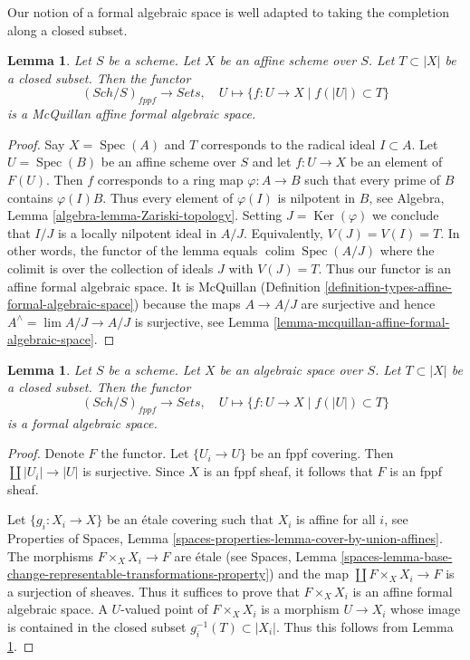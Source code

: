 \documentclass{stacks-project}
\theoremstyle{plain}
\newtheorem{lemma}[subsection]{Lemma}
\theoremstyle{definition}
\theoremstyle{remark}
\numberwithin{equation}{subsection}
\def\lim{\mathop{\mathrm{lim}}\nolimits}
\def\colim{\mathop{\mathrm{colim}}\nolimits}
\def\Spec{\mathop{\mathrm{Spec}}}
\def\Sch{\mathit{Sch}}
\def\Ker{\mathop{\mathrm{Ker}}}
\begin{document}
\noindent
Our notion of a formal algebraic space is well adapted to taking the
completion along a closed subset.

\begin{lemma}
\label{lemma-completion-affine-is-affine-formal-algebraic-space}
Let $S$ be a scheme. Let $X$ be an affine scheme over $S$.
Let $T \subset |X|$ be a closed subset. Then the functor
$$
(\Sch/S)_{fppf} \longrightarrow \textit{Sets},\quad
U \longmapsto \{f : U \to X \mid f(|U|) \subset T\}
$$
is a McQuillan affine formal algebraic space.
\end{lemma}

\begin{proof}
Say $X = \Spec(A)$ and $T$ corresponds to the radical ideal $I \subset A$.
Let $U = \Spec(B)$ be an affine scheme over $S$ and let
$f : U \to X$ be an element of $F(U)$. Then $f$ corresponds to a
ring map $\varphi : A \to B$ such that every prime of $B$ contains
$\varphi(I) B$. Thus every element of $\varphi(I)$ is nilpotent in $B$, see
Algebra, Lemma \ref{algebra-lemma-Zariski-topology}.
Setting $J = \Ker(\varphi)$ we conclude that $I/J$ is a locally nilpotent
ideal in $A/J$. Equivalently, $V(J) = V(I) = T$.
In other words, the functor of the lemma equals
$\colim \Spec(A/J)$ where the colimit is over the
collection of ideals $J$ with $V(J) = T$.
Thus our functor is an affine formal algebraic space. It is McQuillan
(Definition \ref{definition-types-affine-formal-algebraic-space})
because the maps $A \to A/J$ are surjective
and hence $A^\wedge = \lim A/J \to A/J$ is surjective, see
Lemma \ref{lemma-mcquillan-affine-formal-algebraic-space}.
\end{proof}

\begin{lemma}
\label{lemma-completion-is-formal-algebraic-space}
Let $S$ be a scheme. Let $X$ be an algebraic space over $S$.
Let $T \subset |X|$ be a closed subset. Then the functor
$$
(\Sch/S)_{fppf} \longrightarrow \textit{Sets},\quad
U \longmapsto \{f : U \to X \mid f(|U|) \subset T\}
$$
is a formal algebraic space.
\end{lemma}

\begin{proof}
Denote $F$ the functor. Let $\{U_i \to U\}$ be an fppf covering.
Then $\coprod |U_i| \to |U|$ is surjective. Since $X$ is an fppf
sheaf, it follows that $F$ is an fppf sheaf.

\medskip\noindent
Let $\{g_i : X_i \to X\}$ be an \'etale covering such that $X_i$ is affine
for all $i$, see Properties of Spaces, Lemma
\ref{spaces-properties-lemma-cover-by-union-affines}.
The morphisms $F \times_X X_i \to F$ are \'etale
(see Spaces, Lemma
\ref{spaces-lemma-base-change-representable-transformations-property})
and the map $\coprod F \times_X X_i \to F$ is a surjection of sheaves.
Thus it suffices to prove that $F \times_X X_i$ is an affine formal
algebraic space. A $U$-valued point of $F \times_X X_i$ is a
morphism $U \to X_i$ whose image is contained in the closed subset
$g_i^{-1}(T) \subset |X_i|$. Thus this follows from
Lemma \ref{lemma-completion-affine-is-affine-formal-algebraic-space}.
\end{proof}
\end{document}
